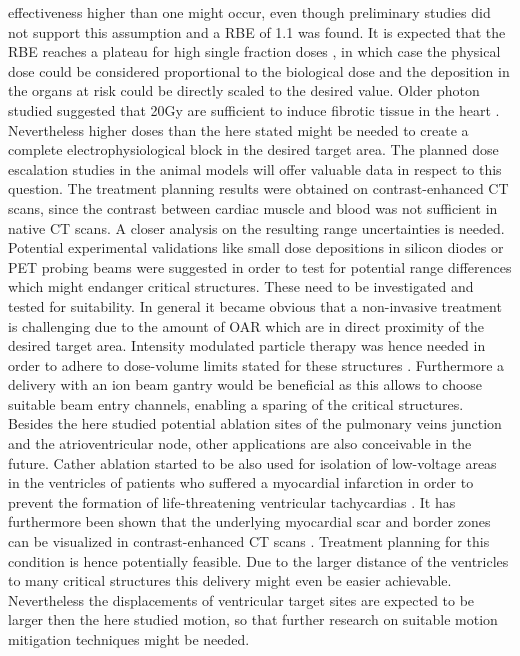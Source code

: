 effectiveness higher than one might occur, even though preliminary studies did not support this assumption and a RBE of 1.1 was found. 
It is expected that the RBE reaches a plateau for high single fraction doses \cite{Cara07}, in which case the physical dose could be 
considered proportional to the biological dose and the deposition in the organs at risk could be directly scaled to the desired value. 
Older photon studied suggested that 20Gy are sufficient to induce fibrotic tissue in the heart \cite{Faj70, Faj73}. 
Nevertheless higher doses than the here stated might be needed to create a complete electrophysiological block in the desired 
target area. The planned dose escalation studies in the animal models will offer valuable data in respect to this question. 
The treatment planning results were obtained on contrast-enhanced CT scans, since the contrast between cardiac muscle 
and blood was not sufficient in native CT scans. A closer analysis on the resulting range uncertainties is needed. Potential 
experimental validations like small dose depositions in silicon diodes \cite{Bent12} or PET probing beams \cite{Lin12} were suggested in order to 
test for potential range differences which might endanger critical structures. These need to be investigated and tested for suitability.\newline
\newline
In general it became obvious that a non-invasive 
treatment is challenging due to the amount of OAR which are in direct proximity of the desired target area. Intensity modulated particle 
therapy was hence needed in order to adhere to dose-volume limits stated for these structures \cite{RTOG0631, RTOG0915}. 
Furthermore a delivery with an ion beam gantry would be beneficial as this allows to choose suitable beam entry channels, 
enabling a sparing of the critical structures.\newline
\newline
Besides the here studied potential ablation sites of the pulmonary veins junction and the atrioventricular node, other applications are also 
conceivable in the future. Cather ablation started to be also used for isolation of low-voltage areas in the ventricles of patients who 
suffered a myocardial infarction in order to prevent the formation of life-threatening ventricular tachycardias \cite{Til14, Mad14}. 
It has furthermore been shown that the underlying myocardial scar and border zones can be visualized in contrast-enhanced CT scans \cite{Tia14}. 
Treatment planning for this condition is hence potentially feasible. Due to the larger distance of the ventricles to many critical structures 
this delivery might even be easier achievable. Nevertheless the displacements of ventricular target sites are expected to be larger then the 
here studied motion, so that further research on suitable motion mitigation techniques might be needed. 

